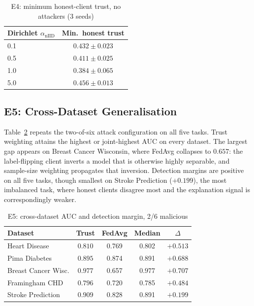 \documentclass[conference]{IEEEtran}
\begin{document}
\begin{table}[t]
 \caption{E4: minimum honest-client trust, no attackers (3 seeds)}
 \label{tab:e4}
 \centering
 \small
 \begin{tabular}{lc}
 \toprule
 Dirichlet $\alpha_{\mathrm{nIID}}$ & Min.\ honest trust \\
 \midrule
 0.1 & $0.432 \pm 0.023$ \\
 0.5 & $0.411 \pm 0.025$ \\
 1.0 & $0.384 \pm 0.065$ \\
 5.0 & $0.456 \pm 0.013$ \\
 \bottomrule
 \end{tabular}
\end{table}

\subsection{E5: Cross-Dataset Generalisation}
\label{sec:e5}
Table~\ref{tab:e5} repeats the two-of-six attack configuration on all five
tasks. Trust weighting attains the highest or joint-highest AUC on every
dataset. The largest gap appears on Breast Cancer Wisconsin, where FedAvg
collapses to $0.657$: the label-flipping client inverts a model that is
otherwise highly separable, and sample-size weighting propagates that
inversion. Detection margins are positive on all five tasks, though smallest
on Stroke Prediction ($+0.199$), the most imbalanced task, where honest
clients disagree most and the explanation signal is correspondingly weaker.

\begin{table}[t]
 \caption{E5: cross-dataset AUC and detection margin, 2/6 malicious}
 \label{tab:e5}
 \centering
 \small
 \begin{tabular}{lcccc}
 \toprule
 Dataset & Trust & FedAvg & Median & $\Delta$ \\
 \midrule
 Heart Disease & $\mathbf{0.810}$ & 0.769 & 0.802 & $+0.513$ \\
 Pima Diabetes & $\mathbf{0.895}$ & 0.874 & 0.891 & $+0.688$ \\
 Breast Cancer Wisc. & $\mathbf{0.977}$ & 0.657 & $\mathbf{0.977}$ &
 $+0.707$ \\
 Framingham CHD & $\mathbf{0.796}$ & 0.720 & 0.785 & $+0.484$ \\
 Stroke Prediction & $\mathbf{0.909}$ & 0.828 & 0.891 & $+0.199$ \\
 \bottomrule
 \end{tabular}
\end{table}
\end{document}
